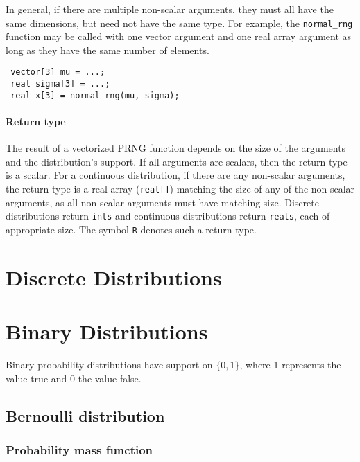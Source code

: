 \documentclass[
  10pt,
]{book}
\begin{document}
In general, if there are multiple non-scalar arguments, they must all
have the same dimensions, but need not have the same type. For
example, the \texttt{normal\_rng} function may be called with one vector
argument and one real array argument as long as they have the same
number of elements.

\begin{verbatim}
 vector[3] mu = ...;
 real sigma[3] = ...;
 real x[3] = normal_rng(mu, sigma);
\end{verbatim}

\hypertarget{return-type}{%
\subsubsection{Return type}\label{return-type}}

The result of a vectorized PRNG function depends on the size of the
arguments and the distribution's support. If all arguments are
scalars, then the return type is a scalar. For a continuous
distribution, if there are any non-scalar arguments, the return type
is a real array (\texttt{real{[}{]}}) matching the size of any of the non-scalar
arguments, as all non-scalar arguments must have matching size.
Discrete distributions return \texttt{ints} and continuous distributions
return \texttt{reals}, each of appropriate size. The symbol \texttt{R} denotes such
a return type.

\hypertarget{discrete-distributions}{%
\chapter*{Discrete Distributions}\label{discrete-distributions}}

\hypertarget{binary-distributions}{%
\chapter{Binary Distributions}\label{binary-distributions}}

Binary probability distributions have support on \(\{0,1\}\), where 1
represents the value true and 0 the value false.

\hypertarget{bernoulli-distribution}{%
\section{Bernoulli distribution}\label{bernoulli-distribution}}

\hypertarget{probability-mass-function}{%
\subsection{Probability mass function}\label{probability-mass-function}}
\end{document}
